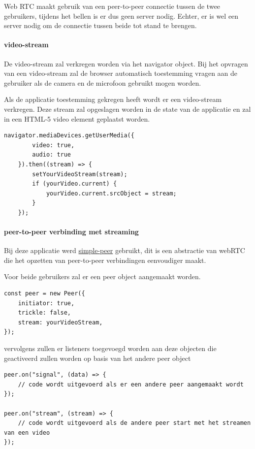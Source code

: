 		Web RTC maakt gebruik van een peer-to-peer connectie tussen de twee gebruikers, tijdens het bellen is er dus geen server nodig. Echter, er is wel een server nodig om de connectie tussen beide tot stand te brengen.
		
		\paragraph{video-stream}
			De video-stream zal verkregen worden via het navigator object. Bij het opvragen van een video-stream zal de browser automatisch toestemming vragen aan de gebruiker als de camera en de microfoon gebruikt mogen worden.
			
			Als de applicatie toestemming gekregen heeft wordt er een video-stream verkregen.
			Deze stream zal opgeslagen worden in de state van de applicatie en zal in een HTML-5 video element geplaatst worden.
		
\begin{lstlisting}
navigator.mediaDevices.getUserMedia({ 
		video: true,
		audio: true 
	}).then((stream) => {
		setYourVideoStream(stream);
		if (yourVideo.current) {
			yourVideo.current.srcObject = stream;
		}
	});
\end{lstlisting}


		\paragraph{peer-to-peer verbinding met streaming}
			Bij deze applicatie werd \href{https://github.com/feross/simple-peer}{simple-peer} gebruikt, dit is een abstractie van webRTC die het opzetten van peer-to-peer verbindingen eenvoudiger maakt.
			
			Voor beide gebruikers zal er een peer object aangemaakt worden.

\begin{lstlisting}
const peer = new Peer({
	initiator: true,
	trickle: false,
	stream: yourVideoStream,
});
\end{lstlisting}
			
			vervolgens zullen er listeners toegevoegd worden aan deze objecten die geactiveerd zullen worden op basis van het andere peer object
			
\begin{lstlisting}
peer.on("signal", (data) => {
	// code wordt uitgevoerd als er een andere peer aangemaakt wordt
});

peer.on("stream", (stream) => {
	// code wordt uitgevoerd als de andere peer start met het streamen van een video
});
\end{lstlisting}



